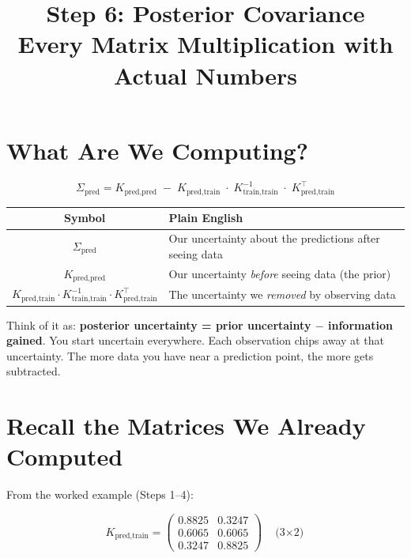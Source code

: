 \documentclass[11pt, a4paper]{article}
\title{\color{secblue}\textbf{Step 6: Posterior Covariance}\\[0.3em]
\Large Every Matrix Multiplication with Actual Numbers}
\author{}
\date{}
\newcommand{\gut}[1]{\begin{tcolorbox}[colback=lightyellow, colframe=orange!50, title=Gut feeling]#1\end{tcolorbox}}
\begin{document}
\maketitle
\thispagestyle{fancy}

\section*{\color{secblue}What Are We Computing?}

\begin{equation}
\Sigma_{\text{pred}} = K_{\text{pred,pred}} \;-\; K_{\text{pred,train}} \;\cdot\; K_{\text{train,train}}^{-1} \;\cdot\; K_{\text{pred,train}}^\top
\tag{S6-1}
\end{equation}

\begin{center}
\begin{tabular}{cl}
\toprule
\textbf{Symbol} & \textbf{Plain English} \\
\midrule
$\Sigma_{\text{pred}}$ & Our uncertainty about the predictions after seeing data \\
$K_{\text{pred,pred}}$ & Our uncertainty \emph{before} seeing data (the prior) \\
$K_{\text{pred,train}} \cdot K_{\text{train,train}}^{-1} \cdot K_{\text{pred,train}}^\top$ & The uncertainty we \emph{removed} by observing data \\
\bottomrule
\end{tabular}
\end{center}

\gut{
Think of it as: \textbf{posterior uncertainty = prior uncertainty $-$ information gained}.
You start uncertain everywhere. Each observation chips away at that uncertainty.
The more data you have near a prediction point, the more gets subtracted.
}

\section*{\color{secblue}Recall the Matrices We Already Computed}

From the worked example (Steps 1--4):

\begin{equation}
K_{\text{pred,train}} =
\begin{pmatrix}
0.8825 & 0.3247 \\
0.6065 & 0.6065 \\
0.3247 & 0.8825
\end{pmatrix}
\quad \text{(3$\times$2)}
\tag{S6-2}
\end{equation}
\end{document}
